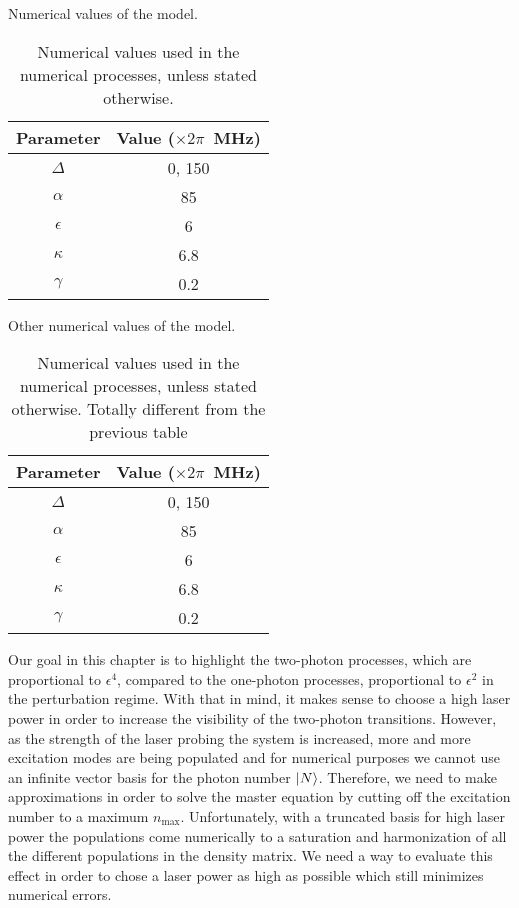 \begin{table} \begin{center}
        \caption{Numerical values of the model. }
        \begin{tabular}{c|c}
            Parameter    & Value ($\times 2 \pi$~MHz) \\ \hline \hline
            $\Delta$     & 0, 150                     \\
            ${\alpha}$   & 85                         \\
            ${\epsilon}$ & 6                          \\
            ${\kappa}$   & 6.8                        \\
            ${\gamma}$   & 0.2
        \end{tabular}
        \label{tab-values}
        \caption*{Numerical values used in the numerical processes, unless stated otherwise. }
    \end{center}\end{table}


\begin{table} \begin{center}
        \caption{Other numerical values of the model. }
        \begin{tabular}{c|c}
            Parameter    & Value ($\times 2 \pi$~MHz) \\ \hline \hline
            $\Delta$     & 0, 150                     \\
            ${\alpha}$   & 85                         \\
            ${\epsilon}$ & 6                          \\
            ${\kappa}$   & 6.8                        \\
            ${\gamma}$   & 0.2
        \end{tabular}
        \label{tab-values2}
        \caption*{Numerical values used in the numerical processes, unless stated otherwise. Totally different from the previous table}
    \end{center}\end{table}

Our goal in this chapter is to highlight the two-photon processes, which are proportional to $\epsilon^4$, compared to the one-photon processes, proportional to $\epsilon^2$ in the perturbation regime. With that in mind, it makes sense to choose a high laser power in order to increase the visibility of the two-photon transitions. However, as the strength of the laser probing the system is increased, more and more excitation modes are being populated and for numerical purposes we cannot use an infinite vector basis for the photon number $| N \rangle$. Therefore, we need to make approximations in order to solve the master equation by cutting off the excitation number to a maximum $n_{\mbox{max}}$. Unfortunately, with a truncated basis for high laser power the populations come numerically to a saturation and harmonization of all the different populations in the density matrix. We need a way to evaluate this effect in order to chose a laser power as high as possible which still minimizes numerical errors.

